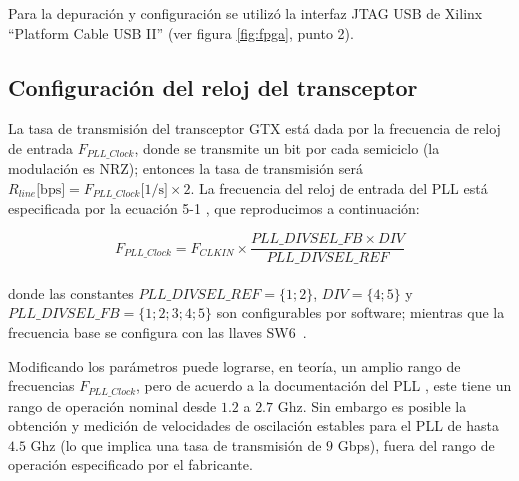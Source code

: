 Para la depuración y configuración se utilizó la interfaz JTAG USB de Xilinx ``Platform Cable
USB II'' \cite{XilJtag} (ver figura \ref{fig:fpga}, punto 2).


\subsection{Configuración del reloj del transceptor}

La tasa de transmisión del transceptor GTX está dada por la
frecuencia de reloj de entrada $F_{PLL\_Clock}$, donde se transmite un
bit por cada semiciclo (la modulación es NRZ); entonces la tasa de
transmisión será
$R_{line}\mbox{[bps]}=F_{PLL\_Clock}\mbox{[1/s]} \times 2$.  La
frecuencia del reloj de entrada del PLL está especificada por la ecuación
5-1 \cite[Pag. 88]{ug198}, que reproducimos a continuación:

\begin{equation}
F_{PLL\_Clock} = F_{CLKIN} \times \frac{PLL\_DIVSEL\_FB \times
DIV}{PLL\_DIVSEL\_REF}%
\end{equation}\\

donde las constantes $PLL\_DIVSEL\_REF = \{1;2\}$, $DIV = \{4;5\} $ y
$PLL\_DIVSEL\_FB = \{1;2;3;4;5\}$ son configurables por software;
mientras que la frecuencia base se configura con las llaves
SW6~\cite[Tabla 1-32]{ug347}.


 Modificando los parámetros puede lograrse, en teoría, un amplio rango
de frecuencias $F_{PLL\_Clock}$, pero de acuerdo a la documentación
del PLL \cite[Pág. 71]{ug366}, este tiene un rango de operación nominal desde $1.2$ a
$2.7$ Ghz. Sin embargo es posible \cite{ortegaaltas} la
obtención y medición de velocidades de oscilación estables para el PLL
de hasta $4.5$ Ghz (lo que implica una tasa de transmisión de $9$ Gbps),
fuera del rango de operación especificado por el fabricante.

